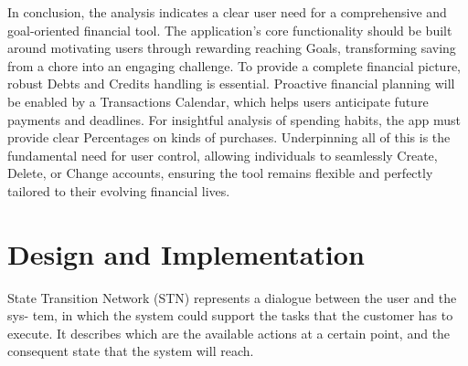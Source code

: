\documentclass[a4paper,12pt]{article}
\begin{document}
In conclusion, the analysis indicates a clear user need for a comprehensive and goal-oriented financial tool. The application's core functionality should be built around motivating users through rewarding reaching Goals, transforming saving from a chore into an engaging challenge. To provide a complete financial picture, robust Debts and Credits handling is essential. Proactive financial planning will be enabled by a Transactions Calendar, which helps users anticipate future payments and deadlines. For insightful analysis of spending habits, the app must provide clear Percentages on kinds of purchases. Underpinning all of this is the fundamental need for user control, allowing individuals to seamlessly Create, Delete, or Change accounts, ensuring the tool remains flexible and perfectly tailored to their evolving financial lives.
\vspace{5cm}
\section{Design and Implementation}
State Transition Network (STN) represents a dialogue between the user and the sys-
tem, in which the system could support the tasks that the customer has to execute. It describes
which are the available actions at a certain point, and the consequent state that the system will reach.
\end{document}
